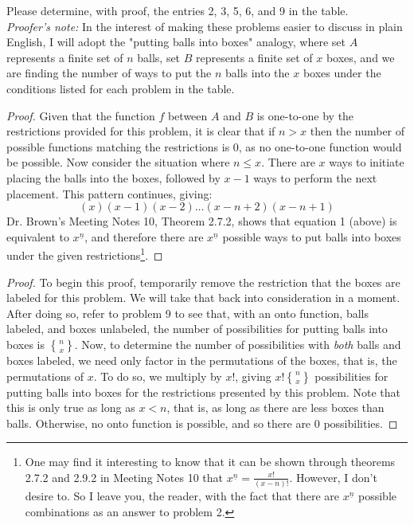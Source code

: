 \documentclass[12pt]{article}
\newcommand{\fallfac}[2]{{#1}^{\underline{#2}}}
\newcommand{\stirling}[2]{\genfrac{\{}{\}}{0pt}{}{#1}{#2}}
\newenvironment{problem}[2][Problem]{\begin{trivlist}
\item[\hskip \labelsep {\bfseries #1}\hskip \labelsep {\bfseries #2.}]}{\end{trivlist}}
\begin{document}
\noindent Please determine, with proof, the entries 2, 3, 5, 6, and 9 in the table.\\

\noindent \textit{Proofer's note:} In the interest of making these problems easier to discuss in plain English, I will adopt the "putting balls into boxes" analogy, where set $A$ represents a finite set of $n$ balls, set $B$ represents a finite set of $x$ boxes, and we are finding the number of ways to put the $n$ balls into the $x$ boxes under the conditions listed for each problem in the table.

\newpage
\begin{problem}{2}
\end{problem}
\begin{proof}
Given that the function $f$ between $A$ and $B$ is one-to-one by the restrictions provided for this problem, it is clear that if $n > x$ then the number of possible functions matching the restrictions is 0, as no one-to-one function would be possible. Now consider the situation where $n \leq x$. There are $x$ ways to initiate placing the balls into the boxes, followed by $x-1$ ways to perform the next placement. This pattern continues, giving:
\begin{equation}
(x)(x-1)(x-2)\dots(x-n+2)(x-n+1) %
\end{equation}
Dr. Brown's Meeting Notes 10, Theorem 2.7.2, shows that equation 1 (above) is equivalent to $ \fallfac{x}{n}$, and therefore there are $ \fallfac{x}{n}$ possible ways to put balls into boxes under the given restrictions\footnote{One may find it interesting to know that it can be shown through theorems 2.7.2 and 2.9.2 in Meeting Notes 10 that $\fallfac{x}{n} = \frac{x!}{(x-n)!}$. However, I don't desire to. So I leave you, the reader, with the fact that there are $\fallfac{x}{n}$ possible combinations as an answer to problem 2.}.
\end{proof}

\begin{problem}{3}
\end{problem}
\begin{proof}
To begin this proof, temporarily remove the restriction that the boxes are labeled for this problem. We will take that back into consideration in a moment. After doing so, refer to problem 9 to see that, with an onto function, balls labeled, and boxes unlabeled, the number of possibilities for putting balls into boxes is $\stirling{n}{x}$. Now, to determine the number of possibilities with \textit{both} balls and boxes labeled, we need only factor in the permutations of the boxes, that is, the permutations of $x$. To do so, we multiply by $x!$, giving $x!\stirling{n}{x}$ possibilities for putting balls into boxes for the restrictions presented by this problem. Note that this is only true as long as $x < n$, that is, as long as there are less boxes than balls. Otherwise, no onto function is possible, and so there are 0 possibilities.
\end{proof}
\end{document}
